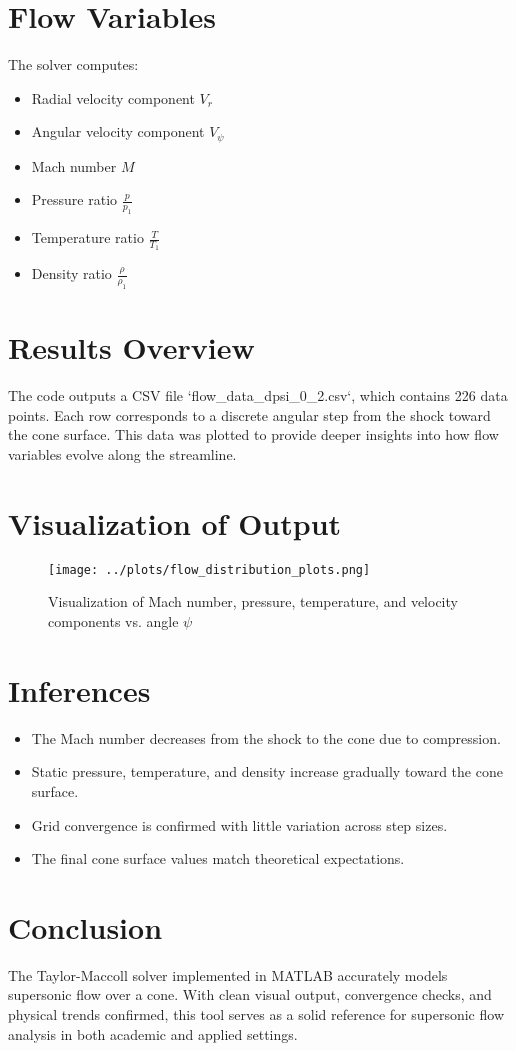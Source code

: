 \documentclass[12pt]{article}
\begin{document}
\section*{Flow Variables}
The solver computes:
\begin{itemize}
    \item Radial velocity component \(V_r\)
    \item Angular velocity component \(V_\psi\)
    \item Mach number \(M\)
    \item Pressure ratio \(\frac{p}{p_1}\)
    \item Temperature ratio \(\frac{T}{T_1}\)
    \item Density ratio \(\frac{\rho}{\rho_1}\)
\end{itemize}

\section*{Results Overview}
The code outputs a CSV file `flow_data_dpsi_0_2.csv`, which contains 226 data points. Each row corresponds to a discrete angular step from the shock toward the cone surface. This data was plotted to provide deeper insights into how flow variables evolve along the streamline.

\section*{Visualization of Output}
\begin{figure}[h!]
\centering
\texttt{[image: ../plots/flow\_distribution\_plots.png]}
\caption{Visualization of Mach number, pressure, temperature, and velocity components vs. angle \(\psi\)}
\end{figure}

\section*{Inferences}
\begin{itemize}
    \item The Mach number decreases from the shock to the cone due to compression.
    \item Static pressure, temperature, and density increase gradually toward the cone surface.
    \item Grid convergence is confirmed with little variation across step sizes.
    \item The final cone surface values match theoretical expectations.
\end{itemize}

\section*{Conclusion}
The Taylor-Maccoll solver implemented in MATLAB accurately models supersonic flow over a cone. With clean visual output, convergence checks, and physical trends confirmed, this tool serves as a solid reference for supersonic flow analysis in both academic and applied settings.
\end{document}
